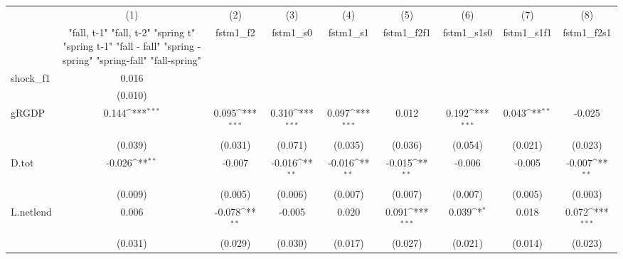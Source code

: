 {
\def\sym#1{\ifmmode^{#1}\else\(^{#1}\)\fi}
\begin{tabular}{l*{8}{c}}
\toprule
            &\multicolumn{1}{c}{(1)}&\multicolumn{1}{c}{(2)}&\multicolumn{1}{c}{(3)}&\multicolumn{1}{c}{(4)}&\multicolumn{1}{c}{(5)}&\multicolumn{1}{c}{(6)}&\multicolumn{1}{c}{(7)}&\multicolumn{1}{c}{(8)}\\
            &\multicolumn{1}{c}{  "fall, t-1" "fall, t-2" "spring t" "spring t-1"  "fall - fall" "spring - spring" "spring-fall" "fall-spring" }&\multicolumn{1}{c}{fstm1\_f2}&\multicolumn{1}{c}{fstm1\_s0}&\multicolumn{1}{c}{fstm1\_s1}&\multicolumn{1}{c}{fstm1\_f2f1}&\multicolumn{1}{c}{fstm1\_s1s0}&\multicolumn{1}{c}{fstm1\_s1f1}&\multicolumn{1}{c}{fstm1\_f2s1}\\
\midrule
shock\_f1    &       0.016         &                     &                     &                     &                     &                     &                     &                     \\
            &     (0.010)         &                     &                     &                     &                     &                     &                     &                     \\
\addlinespace
gRGDP       &       0.144\sym{***}&       0.095\sym{***}&       0.310\sym{***}&       0.097\sym{***}&       0.012         &       0.192\sym{***}&       0.043\sym{**} &      -0.025         \\
            &     (0.039)         &     (0.031)         &     (0.071)         &     (0.035)         &     (0.036)         &     (0.054)         &     (0.021)         &     (0.023)         \\
\addlinespace
D.tot       &      -0.026\sym{**} &      -0.007         &      -0.016\sym{**} &      -0.016\sym{**} &      -0.015\sym{**} &      -0.006         &      -0.005         &      -0.007\sym{**} \\
            &     (0.009)         &     (0.005)         &     (0.006)         &     (0.007)         &     (0.007)         &     (0.007)         &     (0.005)         &     (0.003)         \\
\addlinespace
L.netlend   &       0.006         &      -0.078\sym{**} &      -0.005         &       0.020         &       0.091\sym{***}&       0.039\sym{*}  &       0.018         &       0.072\sym{***}\\
            &     (0.031)         &     (0.029)         &     (0.030)         &     (0.017)         &     (0.027)         &     (0.021)         &     (0.014)         &     (0.023)         \\

\end{tabular}}
